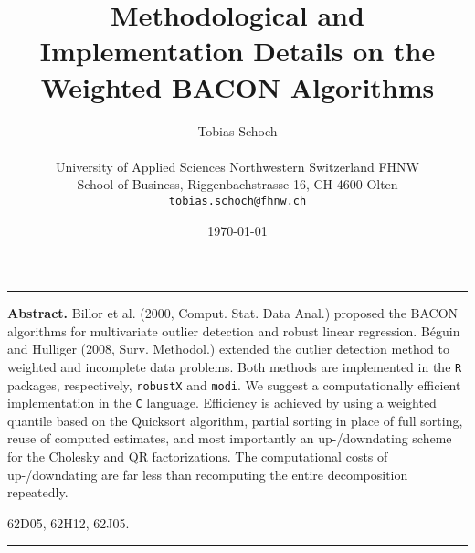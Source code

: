 \documentclass[a4paper,oneside,11pt,DIV=12]{scrartcl}
\newcommand{\code}[1]{{\texttt{#1}}}
\begin{document}

\title{\Large Methodological and Implementation Details on the Weighted BACON
	Algorithms}

\author{{\normalsize Tobias Schoch} \\
\begin{minipage}[t][][t]{\textwidth}
	\begin{center}
	\small{University of Applied Sciences Northwestern Switzerland FHNW} \\
	\small{School of Business, Riggenbachstrasse 16, CH-4600 Olten} \\
	\small{\texttt{tobias.schoch{@}fhnw.ch}}
	\end{center}
\end{minipage}}

\date{{\small \today}}
\maketitle

\renewenvironment{abstract}{%
\begin{center}\begin{minipage}{0.9\textwidth}
\rule{\textwidth}{0.4pt}
{\sffamily\bfseries\footnotesize Abstract.}\small}
{\par\noindent\rule{\textwidth}{0.4pt}\end{minipage}\end{center}}

\begin{abstract}
Billor et al. (2000, Comput. Stat. Data Anal.) proposed the BACON
algorithms for multivariate outlier detection and robust linear
regression. B{\'e}guin and Hulliger (2008, Surv. Methodol.) extended the
outlier detection method to weighted and incomplete data problems. Both
methods are implemented in the \code{R} packages, respectively,
\code{robustX} and \code{modi}. We suggest a computationally efficient
implementation in the \code{C} language. Efficiency is achieved by
using a weighted quantile based on the Quicksort algorithm, partial
sorting in place of full sorting, reuse of computed estimates, and most
importantly an up-/downdating scheme for the Cholesky and QR factorizations.
The computational costs of up-/downdating are far less than recomputing
the entire decomposition repeatedly.

\vspace{0.5em}
 62D05, 62H12, 62J05.
\vspace{-0.5em}
\end{abstract}
\end{document}
